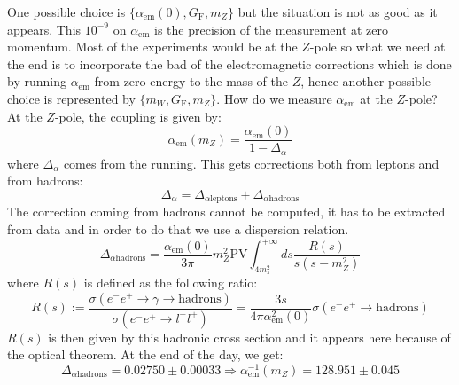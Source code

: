 \documentclass[../main.tex]{subfiles}
\begin{document}
One possible choice is $\{\alpha_{\text{em}}(0), G_{\text{F}}, m_Z \}$ but the situation is not as good as it appears. This $10^{-9}$ on $\alpha_{\text{em}}$ is the precision of the measurement at zero momentum. Most of the experiments would be at the $Z$-pole so what we need at the end is to incorporate the bad of the electromagnetic corrections which is done by running $\alpha_{\text{em}}$ from zero energy to the mass of the $Z$, hence another possible choice is represented by $\{m_W, G_{\text{F}}, m_Z\}$. How do we measure $\alpha_{\text{em}}$ at the $Z$-pole? At the $Z$-pole, the coupling is given by:
\[
\alpha_{\text{em}}(m_Z)=\frac{\alpha_{\text{em}}(0)}{1-\Delta_\alpha}
\]
where $\Delta_\alpha$ comes from the running. This gets corrections both from leptons and from hadrons:
\[
\Delta_\alpha=\Delta_{\alpha\text{leptons}}+\Delta_{\alpha\text{hadrons}}
\]
The correction coming from hadrons cannot be computed, it has to be extracted from data and in order to do that we use a dispersion relation.
\[
\Delta_{\alpha\text{hadrons}}=\frac{\alpha_{\text{em}}(0)}{3\pi}m_Z^2\text{PV}\int_{4m_\pi^2}^{+\infty}ds\frac{R(s)}{s(s-m_Z^2)}
\]
where $R(s)$ is defined as the following ratio:
\[
R(s):=\frac{\sigma(e^-e^+\to\gamma\to\text{hadrons})}{\sigma(e^-e^+\to l^-l^+)}=\frac{3s}{4\pi\alpha^2_{\text{em}}(0)}\sigma(e^-e^+\to\text{hadrons})
\]
$R(s)$ is then given by this hadronic cross section and it appears here because of the optical theorem. At the end of the day, we get:
\[
\Delta_{\alpha\text{hadrons}}=0.02750\pm0.00033\Rightarrow\alpha_{\text{em}}^{-1}(m_Z)=128.951\pm0.045
\]

\end{document}

